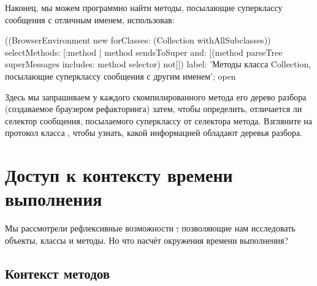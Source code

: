 \documentclass[a4paper,10pt,twoside]{book}
\begin{document}
{%
Наконец, мы можем программно найти методы, посылающие суперклассу сообщения с отличным именем, использовав:
\begin{code}{}
((BrowserEnvironment new forClasses: (Collection withAllSubclasses))
	selectMethods: [:method | 
		method sendsToSuper
		and: [(method parseTree superMessages includes: method selector) not]])
	label: 'Методы класса Collection, посылающие суперклассу сообщения с другим именем';
	open
\end{code}
Здесь мы запрашиваем у каждого скомпилированного метода его дерево разбора (создаваемое браузером рефакторинга) затем, чтобы определить, отличается ли селектор сообщения, посылаемого суперклассу от селектора метода.
Взгляните на протокол  класса , чтобы узнать, какой информацией обладают деревья разбора.

\section{Доступ к контексту времени выполнения}

Мы рассмотрели рефлексивные возможности \st, позволяющие нам исследовать объекты, классы и методы. Но что насчёт окружения времени выполнения?

\subsection{Контекст методов}

}
\end{document}

